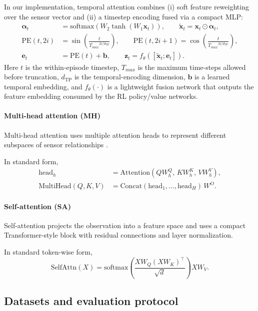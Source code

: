 \documentclass[sn-basic]{sn-jnl} %
\begin{document}
In our implementation, temporal attention combines (i) soft feature reweighting over the sensor vector and (ii) a timestep encoding fused via a compact MLP:
\begin{align}
	\boldsymbol{\alpha}_t &= \mathrm{softmax}\!\left(W_2\tanh\!\left(W_1\mathbf{x}_t\right)\right),
	\qquad \tilde{\mathbf{x}}_t = \mathbf{x}_t\odot\boldsymbol{\alpha}_t,\\
	\mathrm{PE}(t,2i) &= \sin\!\left(\frac{t}{{T_{max}}^{2i/d_{\mathrm{TP}}}}\right),
	\qquad \mathrm{PE}(t,2i+1)=\cos\!\left(\frac{t}{{T_{max}}^{2i/d_{\mathrm{TP}}}}\right),\\
	\mathbf{e}_t &= \mathrm{PE}(t) + \mathbf{b},
	\qquad \mathbf{z}_t = f_\theta\!\left([\tilde{\mathbf{x}}_t;\mathbf{e}_t]\right).
\end{align}
Here $t$ is the within-episode timestep, $T_{max}$ is the maximum time-steps allowed before truncation, $d_{\mathrm{TP}}$ is the temporal-encoding dimension, $\mathbf{b}$ is a learned temporal embedding, and $f_\theta(\cdot)$ is a lightweight fusion network that outputs the feature embedding consumed by the RL policy/value networks.

\paragraph{Multi-head attention (MH)}
Multi-head attention uses multiple attention heads to represent different subspaces of sensor relationships \cite{Vaswani2017}.

In standard form,
\begin{align}
\mathrm{head}_h &= \mathrm{Attention}(QW_h^Q,\,KW_h^K,\,VW_h^V),\\
\mathrm{MultiHead}(Q,K,V) &= \mathrm{Concat}(\mathrm{head}_1,\ldots,\mathrm{head}_H)\,W^O.
\end{align}

\paragraph{Self-attention (SA)}
Self-attention projects the observation into a feature space and uses a compact Transformer-style block with residual connections and layer normalization.

In standard token-wise form,
\begin{equation}
\mathrm{SelfAttn}(X)=\mathrm{softmax}\left(\frac{XW_Q(XW_K)^\top}{\sqrt{d}}\right)XW_V.
\end{equation}

\subsection{Datasets and evaluation protocol} \label{sec:experiment} 
\end{document}

